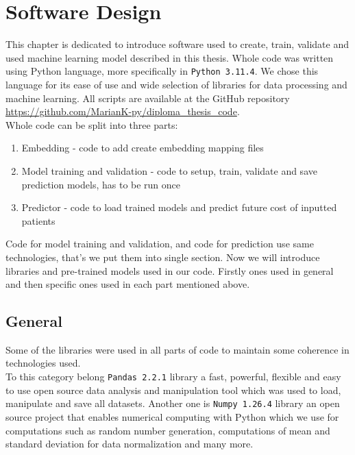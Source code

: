 
\chapter{Software Design} \label{chap:softwaredesign}

This chapter is dedicated to introduce software used to create, train, validate and used machine learning model described in this thesis.
Whole code was written using Python language, more specifically in \texttt{Python 3.11.4}. We chose this language for its ease of use and wide selection of libraries for data processing and machine learning. All scripts are available at the GitHub repository \url{https://github.com/MarianK-py/diploma_thesis_code}.
\\

Whole code can be split into three parts:

\begin{enumerate}
	\item Embedding - code to add create embedding mapping files
	\item Model training and validation - code to setup, train, validate and save prediction models, has to be run once 
	\item Predictor - code to load trained models and predict future cost of inputted patients 
\end{enumerate}

Code for model training and validation, and code for prediction use same technologies, that's we put them into single section. Now we will introduce libraries and pre-trained models used in our code. Firstly ones used in general and then specific ones used in each part mentioned above.

\section{General}

Some of the libraries were used in all parts of code to maintain some coherence in technologies used. 
\\

To this category belong \texttt{Pandas 2.2.1} library a fast, powerful, flexible and easy to use open source data analysis and manipulation tool \cite{pandas} which was used to load, manipulate and save all datasets. Another one is \texttt{Numpy 1.26.4} library an open source project that enables numerical computing with Python \cite{numpy} which we use for computations such as random number generation, computations of mean and standard deviation for data normalization and many more.



